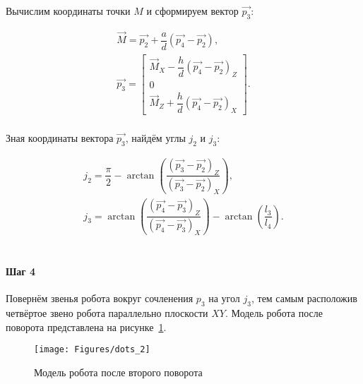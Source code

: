 Вычислим координаты точки $M$ и сформируем вектор $\overrightarrow{p_3}$:

\begin{gather*}
    \overrightarrow{M} = \overrightarrow{p_2} + \dfrac{a}{d} \left( \overrightarrow{p_4} - \overrightarrow{p_2} \right), \\
    \overrightarrow{p_3} =
    \begin{bmatrix}
        \overrightarrow{M}_X - \dfrac{h}{d} \left( \overrightarrow{p_4} - \overrightarrow{p_2} \right)_Z \\
        0                                                                                                \\
        \overrightarrow{M}_Z + \dfrac{h}{d} \left( \overrightarrow{p_4} - \overrightarrow{p_2} \right)_X
    \end{bmatrix}.
\end{gather*} \\

Зная координаты вектора $\overrightarrow{p_3}$, найдём углы $j_2$ и $j_3$:

\begin{gather*}
    j_2 = \dfrac{\pi}{2} - \arctan \left( \dfrac
    {\left( \overrightarrow{p_3} - \overrightarrow{p_2} \right)_Z}
    {\left( \overrightarrow{p_3} - \overrightarrow{p_2} \right)_X} \right), \\
    j_3 = \arctan \left( \dfrac
    {\left( \overrightarrow{p_4} - \overrightarrow{p_3} \right)_Z}
    {\left( \overrightarrow{p_4} - \overrightarrow{p_3} \right)_X} \right) - \arctan\left( \dfrac{l_3}{l_4} \right).
\end{gather*} \\

\paragraph{Шаг 4}

Повернём звенья робота вокруг сочленения $p_3$ на угол $j_3$, тем самым расположив четвёртое звено робота параллельно плоскости $XY$.
Модель робота после поворота представлена на рисунке~\ref{fig:ikp:dots_2}.

\begin{figure}[H]
    \centering
    \vspace{14pt}
    \texttt{[image: Figures/dots\_2]}
    \caption{Модель робота после второго поворота}
    \label{fig:ikp:dots_2}
\end{figure}

